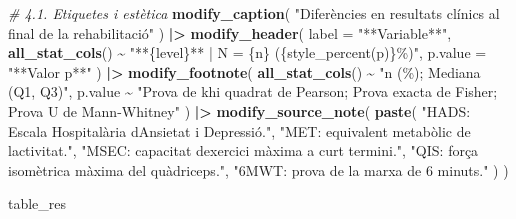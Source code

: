 \documentclass[CAT]{TFUOC}%
\newenvironment{Shaded}{\begin{snugshade}}{\end{snugshade}}
\newcommand{\AttributeTok}[1]{\textcolor[rgb]{0.13,0.29,0.53}{#1}}
\newcommand{\CommentTok}[1]{\textcolor[rgb]{0.56,0.35,0.01}{\textit{#1}}}
\newcommand{\FunctionTok}[1]{\textcolor[rgb]{0.13,0.29,0.53}{\textbf{#1}}}
\newcommand{\NormalTok}[1]{#1}
\newcommand{\SpecialCharTok}[1]{\textcolor[rgb]{0.81,0.36,0.00}{\textbf{#1}}}
\newcommand{\StringTok}[1]{\textcolor[rgb]{0.31,0.60,0.02}{#1}}
\begin{document}
\begin{Shaded}
\begin{Highlighting}[]
  \CommentTok{\# 4.1. Etiquetes i estètica}
  \FunctionTok{modify\_caption}\NormalTok{(}
    \StringTok{"Diferències en resultats clínics al final de la rehabilitació"}
\NormalTok{  ) }\SpecialCharTok{|\textgreater{}}
  \FunctionTok{modify\_header}\NormalTok{(}
    \AttributeTok{label =} \StringTok{"**Variable**"}\NormalTok{, }
    \FunctionTok{all\_stat\_cols}\NormalTok{() }\SpecialCharTok{\textasciitilde{}} \StringTok{"**\{level\}** | N = \{n\} (\{style\_percent(p)\}\%)"}\NormalTok{,}
    \AttributeTok{p.value =} \StringTok{"**Valor p**"}
\NormalTok{  ) }\SpecialCharTok{|\textgreater{}} 
  \FunctionTok{modify\_footnote}\NormalTok{(}
    \FunctionTok{all\_stat\_cols}\NormalTok{() }\SpecialCharTok{\textasciitilde{}} \StringTok{"n (\%); Mediana (Q1, Q3)"}\NormalTok{, }
\NormalTok{    p.value }\SpecialCharTok{\textasciitilde{}} \StringTok{"Prova de khi quadrat de Pearson; Prova exacta de Fisher; }
\StringTok{    Prova U de Mann{-}Whitney"}
\NormalTok{  ) }\SpecialCharTok{|\textgreater{}} 
  \FunctionTok{modify\_source\_note}\NormalTok{(}
    \FunctionTok{paste}\NormalTok{(}
      \StringTok{"HADS: Escala Hospitalària d\textquotesingle{}Ansietat i Depressió."}\NormalTok{, }
      \StringTok{"MET: equivalent metabòlic de l\textquotesingle{}activitat."}\NormalTok{, }
      \StringTok{"MSEC: capacitat d\textquotesingle{}exercici màxima a curt termini."}\NormalTok{, }
      \StringTok{"QIS: força isomètrica màxima del quàdriceps."}\NormalTok{, }
      \StringTok{"6MWT: prova de la marxa de 6 minuts."}
\NormalTok{    )}
\NormalTok{  )}

\NormalTok{table\_res}
  

\end{Highlighting}
\end{Shaded}
\end{document}
